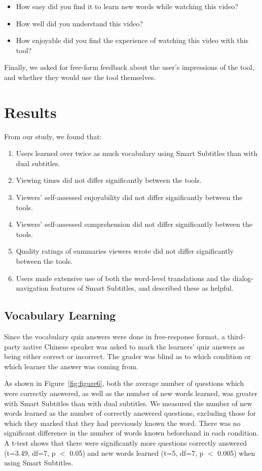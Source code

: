 \documentclass{sigchi}
\begin{document}
\begin{itemize}[noitemsep]
\item How easy did you find it to learn new words while watching this video?
\item How well did you understand this video?
\item How enjoyable did you find the experience of watching this video with this tool?
\end{itemize}

Finally, we asked for free-form feedback about the user's impressions of the tool, and whether they would use the tool themselves.

\section{Results}

From our study, we found that:

\begin{enumerate}[noitemsep]
\item Users learned over twice as much vocabulary using Smart Subtitles than with dual subtitles.
\item Viewing times did not differ significantly between the tools.
\item Viewers' self-assessed enjoyability did not differ significantly between the tools.
\item Viewers' self-assessed comprehension did not differ significantly between the tools.
\item Quality ratings of summaries viewers wrote did not differ significantly
between the tools.
\item Users made extensive use of both the word-level translations and the dialog-navigation features of Smart Subtitles, and described these as helpful.
\end{enumerate}

\subsection{Vocabulary Learning}

Since the vocabulary quiz answers were done in free-response format, a third-party native Chinese speaker was asked to mark the learners' quiz answers as being either correct or incorrect. The grader was blind as to which condition or which learner the answer was coming from.

As shown in Figure~\ref{fig:figure6}, both the average number of questions which were correctly answered, as well as the number of new words learned, was greater with Smart Subtitles than with dual subtitles. We measured the number of new words learned as the number of correctly answered questions, excluding those for which they marked that they had previously known the word. There was no significant difference in the number of words known beforehand in each condition. A t-test shows that there were significantly more questions correctly answered (t=3.49, df=7, p $<$ 0.05) and new words learned (t=5, df=7, p $<$ 0.005) when using Smart Subtitles.
\end{document}
